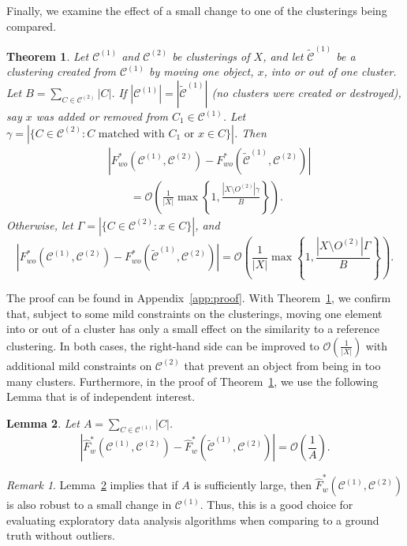 \documentclass[11pt]{article}
\newtheorem{thm}{Theorem}
\newtheorem{lem}[thm]{Lemma}
\theoremstyle{remark}
\newtheorem*{remark}{Remark}
\newcommand\cCone{\mathcal{C}^{(1)}}
\newcommand\tcCone{\tilde{\mathcal{C}}^{(1)}}
\newcommand\cCtwo{\mathcal{C}^{(2)}}
\newcommand{\bigO}{\mathcal{O}}
\begin{document}
Finally, we examine the effect of a small change to one of the clusterings being compared.
\begin{thm}\label{thm:robust}
    Let $\cCone$ and $\cCtwo$ be clusterings of $X$, and let $\tcCone$ be a clustering created from $\cCone$ by moving one object, $x$, into or out of one cluster.
    Let $B = \sum_{C \in \cCtwo} |C|$.
    If $|\cCone| = |\tcCone|$ (no clusters were created or destroyed), say $x$ was added or removed from $C_1 \in \cCone$.
    Let $\gamma = |\{C \in \cCtwo : C \text{ matched with } C_1 \text{ or } x \in C\}|$.
    Then
    \begin{align*}
    &\left| F^*_{wo}(\cCone, \cCtwo) - F^*_{wo}(\tcCone, \cCtwo) \right|\\
    &\qquad = \bigO \left( \frac{1}{|X|} \max \left\{ 1, \frac{|X \setminus O^{(2)}| \gamma}{B} \right\} \right).
    \end{align*}
    Otherwise, let $\Gamma = |\{C \in \cCtwo : x \in C\}|$, and
    \begin{equation*}
            \left| F^*_{wo}(\cCone, \cCtwo) - F^*_{wo}(\tcCone, \cCtwo) \right| = \bigO \left( \frac{1}{|X|} \max \left\{ 1, \frac{|X \setminus O^{(2)}| \Gamma}{B} \right\} \right).
    \end{equation*}
\end{thm}
The proof can be found in Appendix~\ref{app:proof}.
With Theorem~\ref{thm:robust}, we confirm that, subject to some mild constraints on the clusterings, moving one element into or out of a cluster has only a small effect on the similarity to a reference clustering.
In both cases, the right-hand side can be improved to $\bigO(\frac{1}{|X|})$ with additional mild constraints on $\cCtwo$ that prevent an object from being in too many clusters.
Furthermore, in the proof of Theorem~\ref{thm:robust}, we use the following Lemma that is of independent interest.

\begin{lem}\label{lem:two}
    Let $A = \sum_{C \in \cCone} |C|$.
    \begin{equation*}
        \left| \hat{F}^*_w(\cCone, \cCtwo) - \hat{F}^*_w(\tcCone, \cCtwo) \right| = \bigO\left(\frac{1}{A}\right).
    \end{equation*}
\end{lem}

\begin{remark}
    Lemma~\ref{lem:two} implies that if $A$ is sufficiently large, then $\hat{F}^*_w(\cCone, \cCtwo)$ is also robust to a small change in $\cCone$.
    Thus, this is a good choice for evaluating exploratory data analysis algorithms when comparing to a ground truth without outliers.
\end{remark}
\end{document}
